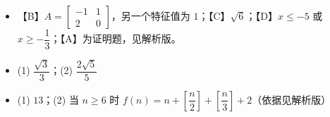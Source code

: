 \begin{itemize}[leftmargin=2.6em]
  \item[\textbf{21.}] 【B】$A=\begin{bmatrix}-1&1\\2&0\end{bmatrix}$，另一个特征值为 \(1\)；【C】\(\sqrt{6}\)；【D】\(x\leqslant-5\) 或 \(x\geqslant-\dfrac{1}{3}\)；【A】为证明题，见解析版。
  \item[\textbf{22.}] (1) \(\dfrac{\sqrt{3}}{3}\)；(2) \(\dfrac{2\sqrt{5}}{5}\)
  \item[\textbf{23.}] (1) \(13\)；(2) 当 \(n\geqslant 6\) 时 \(f(n)=n+\left[\dfrac{n}{2}\right]+\left[\dfrac{n}{3}\right]+2\)（依据见解析版）
\end{itemize}
